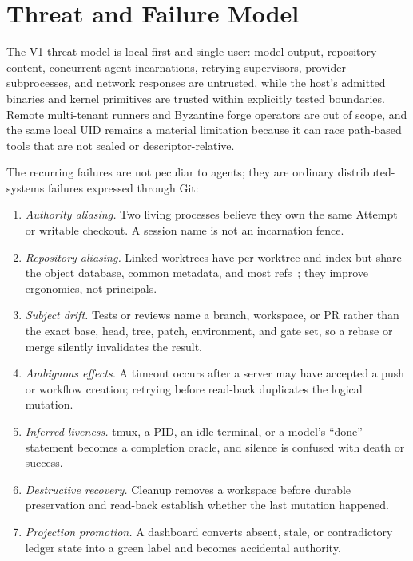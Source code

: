 \documentclass[journal]{IEEEtran}
\newcommand{\code}[1]{\texttt{\detokenize{#1}}}
\begin{document}
\section{Threat and Failure Model}
\label{sec:threat}

The V1 threat model is local-first and single-user: model output, repository
content, concurrent agent incarnations, retrying supervisors, provider
subprocesses, and network responses are untrusted, while the host's admitted
binaries and kernel primitives are trusted within explicitly tested
boundaries. Remote multi-tenant runners and Byzantine forge operators are out
of scope, and the same local UID remains a material limitation because it can
race path-based tools that are not sealed or descriptor-relative.

The recurring failures are not peculiar to agents; they are ordinary
distributed-systems failures expressed through Git:

\begin{enumerate}
\item \emph{Authority aliasing.} Two living processes believe they own the same
Attempt or writable checkout. A session name is not an incarnation fence.
\item \emph{Repository aliasing.} Linked worktrees have per-worktree
\code{HEAD} and index but share the object database, common metadata, and most
refs~\cite{gitWorktree}; they improve ergonomics, not principals.
\item \emph{Subject drift.} Tests or reviews name a branch, workspace, or PR
rather than the exact base, head, tree, patch, environment, and gate set, so
a rebase or merge silently invalidates the result.
\item \emph{Ambiguous effects.} A timeout occurs after a server may have
accepted a push or workflow creation; retrying before read-back duplicates
the logical mutation.
\item \emph{Inferred liveness.} tmux, a PID, an idle terminal, or a model's
``done'' statement becomes a completion oracle, and silence is confused with
death or success.
\item \emph{Destructive recovery.} Cleanup removes a workspace before durable
preservation and read-back establish whether the last mutation happened.
\item \emph{Projection promotion.} A dashboard converts absent, stale, or
contradictory ledger state into a green label and becomes accidental
authority.
\end{enumerate}
\end{document}
